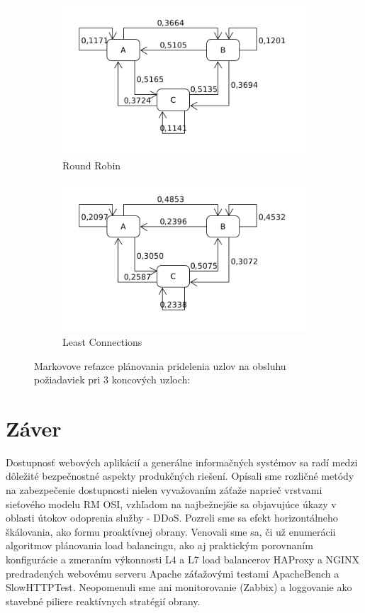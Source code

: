 \documentclass[12pt, a4paper]{article}
\begin{document}
\begin{figure}[h!]
	\centering
	\begin{subfigure}[t]{.48\textwidth}
  		\centering
  		\includegraphics[width=\textwidth]{images/10000-3-RR.png}
  		\caption{Round Robin}
	\end{subfigure}
	\begin{subfigure}[t]{.48\textwidth}
  		\centering
  		\includegraphics[width=\textwidth]{images/10000-3-LC.png}
  		\caption{Least Connections}
	\end{subfigure}
	\caption{Markovove reťazce plánovania pridelenia uzlov na obsluhu požiadaviek
	pri 3 koncových uzloch: \usebox{\shield}
	}
	\label{markov-3}
\end{figure}

\section{Záver}
Dostupnosť webových aplikácií a generálne informačných systémov sa radí medzi dôležité
bezpečnostné aspekty produkčných riešení. Opísali sme rozličné metódy na zabezpečenie
dostupnosti nielen vyvažovaním záťaže naprieč vrstvami sieťového modelu RM OSI, vzhľadom
na najbežnejšie sa objavujúce úkazy v oblasti útokov odoprenia služby - DDoS. 
Pozreli sme sa efekt horizontálneho škálovania, ako formu proaktívnej obrany. Venovali sme sa, či už
enumerácii algoritmov plánovania 
load balancingu, ako aj praktickým porovnaním konfigurácie a zmeraním výkonnosti L4 a L7 
load balancerov HAProxy a NGINX predradených webovému serveru Apache záťažovými testami ApacheBench a 
SlowHTTPTest. Neopomenuli sme ani monitorovanie (Zabbix) a loggovanie ako stavebné piliere reaktívnych 
stratégií obrany.
\end{document}
